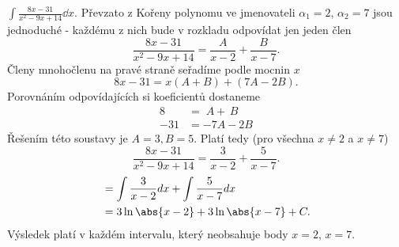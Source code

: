 \begin{mdframed}[style=mdexam]
  \begin{example}\label{MAI:exam128}
    $\displaystyle\int{\frac{8x-31}{x^2-9x+14}}\dd{x}$. Převzato z \cite[s.~90]{Knichal}\newline
    Kořeny polynomu ve jmenovateli $\alpha_1 = 2$, $\alpha_2 = 7$ jsou jednoduché - každému z
    nich bude v rozkladu odpovídat jen jeden člen $$\frac{8x-31}{x^2-9x+14} = \frac{A}{x-2}
    + \frac{B}{x-7}.$$ Členy mnohočlenu na pravé straně seřadíme podle mocnin $x$ $$8x-31 =
     x(A+B)+(7A-2B).$$ Porovnáním odpovídajících si koeficientů dostaneme
    \begin{align*}
      8   &=   \; A + \, B \\
      -31 &= -7A - 2B
    \end{align*}
    Řešením této soustavy je $A = 3, B = 5$. Platí tedy (pro všechna $x \neq 2$ a $x \neq 7$)
    $$\frac{8x-31}{x^2-9x+14} = \frac{3}{x-2} + \frac{5}{x-7}.$$
    \begin{align*}
        &= \int{\frac{3}{x-2}}dx + \int{\frac{5}{x-7}}dx      \\
        &= 3\ln\abs{x-2} + 3\ln\abs{x-7} + C.
    \end{align*}
    Výsledek platí v každém intervalu, který neobsahuje body \(x = 2\), \(x = 7\).
  \end{example}
\end{mdframed}